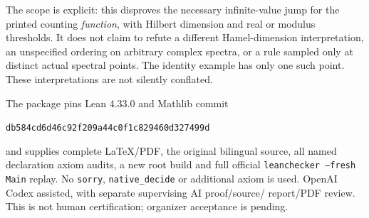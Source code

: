 \documentclass[11pt]{article}
\begin{document}
The scope is explicit: this disproves the necessary infinite-value
jump for the printed counting \emph{function}, with Hilbert
dimension and real or modulus thresholds. It does not claim to
refute a different Hamel-dimension interpretation, an unspecified
ordering on arbitrary complex spectra, or a rule sampled only at
distinct actual spectral points. The identity example has only
one such point. These interpretations are not silently conflated.

The package pins Lean 4.33.0 and Mathlib commit
\begin{center}\small\texttt{db584cd6d46c92f209a44c0f1c829460d327499d}\end{center}
and supplies complete LaTeX/PDF, the original bilingual source,
all named declaration axiom audits, a new root build and full
official \texttt{leanchecker --fresh Main} replay. No
\texttt{sorry}, \texttt{native\_decide} or additional axiom is used.
OpenAI Codex assisted, with separate supervising AI proof/source/
report/PDF review. This is not human certification; organizer
acceptance is pending.
\end{document}
